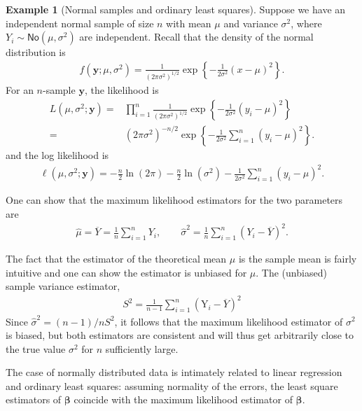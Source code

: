 \documentclass[
  11pt,
  letterpaper,
]{book}
\theoremstyle{definition}
\theoremstyle{definition}
\newtheorem{example}{Example}[chapter]
\theoremstyle{definition}
\theoremstyle{definition}
\theoremstyle{remark}
\begin{document}
\begin{example}[Normal samples and ordinary least squares]
\protect\hypertarget{exm:normal}{}{\label{exm:normal} {} }Suppose we have an independent normal sample of size \(n\) with mean \(\mu\) and variance \(\sigma^2\), where
\(Y_i \sim \mathsf{No}(\mu, \sigma^2)\) are independent.
Recall that the density of the normal distribution is
\begin{align*}
f(\boldsymbol{y}; \mu, \sigma^2)=\frac{1}{(2\pi \sigma^2)^{1/2}}\exp\left\{-\frac{1}{2\sigma^2}(x-\mu)^2\right\}.
\end{align*}
For an \(n\)-sample \(\boldsymbol{y}\), the likelihood is
\begin{align*}
L(\mu, \sigma^2; \boldsymbol{y})=&\prod_{i=1}^n\frac{1}{({2\pi \sigma^2})^{1/2}}\exp\left\{-\frac{1}{2\sigma^2}(y_i-\mu)^2\right\}\\
=&(2\pi \sigma^2)^{-n/2}\exp\left\{-\frac{1}{2\sigma^2}\sum_{i=1}^n(y_i-\mu)^2\right\}.
\end{align*}
and the log likelihood is
\begin{align*}
\ell(\mu, \sigma^2; \boldsymbol{y})=-\frac{n}{2}\ln(2\pi) -\frac{n}{2}\ln(\sigma^2)-\frac{1}{2\sigma^2}\sum_{i=1}^n (y_i-\mu)^2.
\end{align*}

One can show that the maximum likelihood estimators for the two parameters are
\begin{align*}
\widehat{\mu}=\overline{Y}=\frac{1}{n} \sum_{i=1}^n Y_i, \qquad \widehat{\sigma}^2=\frac{1}{n}\sum_{i=1}^n (Y_i-\overline{Y})^2.
\end{align*}

The fact that the estimator of the theoretical mean \(\mu\) is the sample mean is fairly intuitive and one can show the estimator is unbiased for \(\mu\). The (unbiased) sample variance estimator,
\begin{align*}
S^2=\frac{1}{n-1} \sum_{i=1}^n (\mathrm{Y}_i-\overline{Y})^2
\end{align*}
Since \(\widehat{\sigma}^2=(n-1)/n S^2\), it follows that the maximum likelihood estimator of \(\sigma^2\) is biased, but both estimators are consistent and will thus get arbitrarily close to the true value \(\sigma^2\) for \(n\) sufficiently large.

The case of normally distributed data is intimately related to linear regression and ordinary least squares: assuming normality of the errors, the least square estimators of \(\boldsymbol{\beta}\) coincide with the maximum likelihood estimator of \(\boldsymbol{\beta}\).


\end{example}
\end{document}
